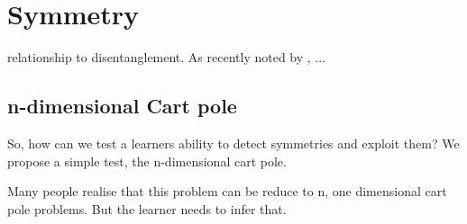 \section{Symmetry}

relationship to disentanglement.
As recently noted by \cite{Caselles-Dupre2019}, ...



\subsection{n-dimensional Cart pole}

So, how can we test a learners ability to detect symmetries and exploit them?
We propose a simple test, the n-dimensional cart pole.


Many people realise that this problem can be reduce to n, one dimensional cart pole problems.
But the learner needs to infer that.
